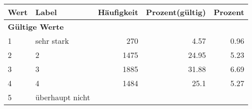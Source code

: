      \begin{longtable}{lXrrr}
     \toprule
     \textbf{Wert} & \textbf{Label} & \textbf{Häufigkeit} & \textbf{Prozent(gültig)} & \textbf{Prozent} \\
     \endhead
     \midrule
     \multicolumn{5}{l}{\textbf{Gültige Werte}}\\

     1 &
     \multicolumn{1}{X}{ sehr stark   } &


       \num{270} &
       \num[round-mode=places,round-precision=2]{4.57} &
         \num[round-mode=places,round-precision=2]{0.96} \\

     2 &
     \multicolumn{1}{X}{ 2   } &


       \num{1475} &
       \num[round-mode=places,round-precision=2]{24.95} &
         \num[round-mode=places,round-precision=2]{5.23} \\

     3 &
     \multicolumn{1}{X}{ 3   } &


       \num{1885} &
       \num[round-mode=places,round-precision=2]{31.88} &
         \num[round-mode=places,round-precision=2]{6.69} \\

     4 &
     \multicolumn{1}{X}{ 4   } &


       \num{1484} &
       \num[round-mode=places,round-precision=2]{25.1} &
         \num[round-mode=places,round-precision=2]{5.27} \\

     5 &
     \multicolumn{1}{X}{ überhaupt nicht   } &



\end{longtable}
